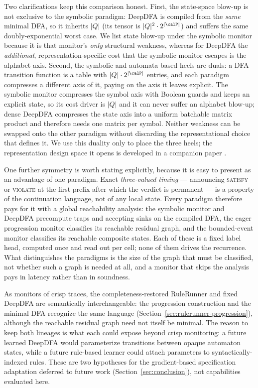 Two clarifications keep this comparison honest. First, the state-space blow-up is not exclusive to the symbolic paradigm: DeepDFA is compiled from the \emph{same} minimal DFA, so it inherits $|Q|$ (its tensor is $|Q|^2 \cdot 2^{|\calP|}$) and suffers the same doubly-exponential worst case. We list state blow-up under the symbolic monitor because it is that monitor's \emph{only} structural weakness, whereas for DeepDFA the \emph{additional}, representation-specific cost that the symbolic monitor escapes is the alphabet axis. Second, the symbolic and automata-based heels are duals: a DFA transition function is a table with $|Q| \cdot 2^{|\calP|}$ entries, and each paradigm compresses a different axis of it, paying on the axis it leaves explicit. The symbolic monitor compresses the symbol axis with Boolean guards and keeps an explicit state, so its cost driver is $|Q|$ and it can never suffer an alphabet blow-up; dense DeepDFA compresses the state axis into a uniform batchable matrix product and therefore needs one matrix per symbol. Neither weakness can be swapped onto the other paradigm without discarding the representational choice that defines it. We use this duality only to place the three heels; the representation design space it opens is developed in a companion paper \paperB{}.

One further symmetry is worth stating explicitly, because it is easy to present as an advantage of one paradigm. Exact \emph{three-valued timing} --- announcing \textsc{satisfy} or \textsc{violate} at the first prefix after which the verdict is permanent --- is a property of the continuation language, not of any local state. Every paradigm therefore pays for it with a global reachability analysis: the symbolic monitor and DeepDFA precompute traps and accepting sinks on the compiled DFA, the eager progression monitor classifies its reachable residual graph, and the bounded-event monitor classifies its reachable composite states. Each of these is a fixed label head, computed once and read out per cell; none of them drives the recurrence. What distinguishes the paradigms is the size of the graph that must be classified, not whether such a graph is needed at all, and a monitor that skips the analysis pays in latency rather than in soundness.

As monitors of crisp traces, the completeness-restored RuleRunner and fixed DeepDFA are semantically interchangeable: the progression construction and the minimal DFA recognize the same \ltlf language (Section~\ref{sec:rulerunner-progression}), although the reachable residual graph need not itself be minimal. The reason to keep both lineages is what each could expose beyond crisp monitoring: a future learned DeepDFA would parameterize transitions between opaque automaton states, while a future rule-based learner could attach parameters to syntactically-indexed rules. These are two hypotheses for the gradient-based specification adaptation deferred to future work (Section~\ref{sec:conclusion}), not capabilities evaluated here.

